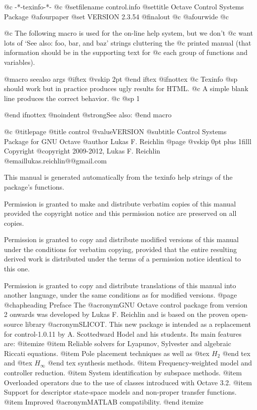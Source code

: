    @c -*-texinfo-*-
@c %
@setfilename control.info
@settitle Octave Control Systems Package
@afourpaper
@set VERSION 2.3.54
@finalout
@c @afourwide
@c %


@c The following macro is used for the on-line help system, but we don't
@c want lots of `See also: foo, bar, and baz' strings cluttering the
@c printed manual (that information should be in the supporting text for
@c each group of functions and variables).

@macro seealso {args}
@iftex
@vskip 2pt
@end iftex
@ifnottex
@c Texinfo @sp should work but in practice produces ugly results for HTML.
@c A simple blank line produces the correct behavior. 
@c @sp 1

@end ifnottex
@noindent
@strong{See also:} \args\.
@end macro


@c %
@titlepage
@title control @value{VERSION}
@subtitle Control Systems Package for GNU Octave
@author Lukas F. Reichlin
@page
@vskip 0pt plus 1filll
Copyright @copyright{} 2009-2012, Lukas F. Reichlin @email{lukas.reichlin@@gmail.com}

This manual is generated automatically from the texinfo help strings
of the package's functions.

Permission is granted to make and distribute verbatim copies of
this manual provided the copyright notice and this permission notice
are preserved on all copies.

Permission is granted to copy and distribute modified versions of this
manual under the conditions for verbatim copying, provided that the entire
resulting derived work is distributed under the terms of a permission
notice identical to this one.

Permission is granted to copy and distribute translations of this manual
into another language, under the same conditions as for modified versions.
@page
@chapheading Preface
The @acronym{GNU} Octave control package from version 2 onwards was
developed by Lukas F. Reichlin and is based on the proven open-source
library @acronym{SLICOT}. This new package is intended as a replacement
for control-1.0.11 by A. Scottedward Hodel and his students.
Its main features are:
@itemize
@item Reliable solvers for Lyapunov, Sylvester and algebraic Riccati equations.
@item Pole placement techniques as well as @tex $ H_2 $ @end tex
and @tex $ H_{\infty} $ @end tex
synthesis methods.
@item Frequency-weighted model and controller reduction.
@item System identification by subspace methods.
@item Overloaded operators due to the use of classes introduced with Octave 3.2.
@item Support for descriptor state-space models and non-proper transfer functions.
@item Improved @acronym{MATLAB} compatibility.
@end itemize

